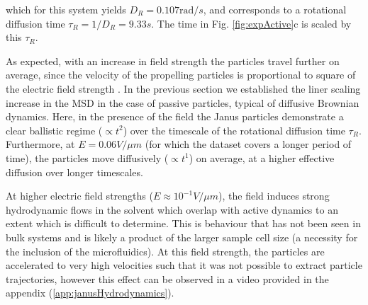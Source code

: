 \noindent which for this system yields $D_R = 0.107 \textrm{rad}/s$, and corresponds to a rotational diffusion time $\tau_R = 1 / D_R = 9.33s$. The time in Fig. \ref{fig:expActive}c is scaled by this $\tau_R$. 

As expected, with an increase in field strength the particles travel further on average, since the velocity of the propelling particles is proportional to square of the electric field strength \cite{gangwal2008}. In the previous section we established the liner scaling increase in the MSD in the case of passive particles, typical of diffusive Brownian dynamics. Here, in the presence of the field the Janus particles demonstrate a clear ballistic regime ($\propto t^2$) over the timescale of the rotational diffusion time $\tau_R$. Furthermore, at $E = 0.06 V/\mu m$ (for which the dataset covers a longer period of time), the particles move diffusively ($\propto t^1$) on average, at a higher effective diffusion over longer timescales. 


At higher electric field strengths ($E \approx 10^{-1} V / \mu m$), the field induces strong hydrodynamic flows in the solvent which overlap with active dynamics to an extent which is difficult to determine. This is behaviour that has not been seen in bulk systems and is likely a product of the larger sample cell size (a necessity for the inclusion of the microfluidics). At this field strength, the particles are accelerated to very high velocities such that it was not possible to extract particle trajectories, however this effect can be observed in a video provided in the appendix (\ref{app:janusHydrodynamics}).


